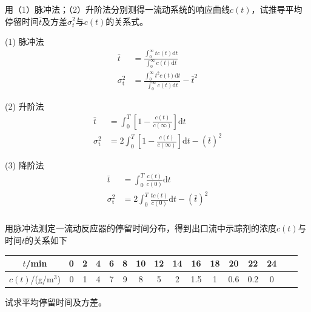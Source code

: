 \begin{frame}[t]
    \frametitle{}

    \begin{example}
        用（1）脉冲法；（2）升阶法分别测得一流动系统的响应曲线$c(t)$，试推导平均停留时间$\bar{t}$及方差$\sigma_{t}^{2}$与$c(t)$的关系式。
    \end{example}
    \pause
    \begin{minipage}{0.32\linewidth}
        (1) 脉冲法
        \[
            \begin{aligned}
                \bar{t}&=\frac{\int_{0}^{\infty} t c(t) \mathrm{d} t}{\int_{0}^{\infty} c(t) \mathrm{d} t} \\
                \sigma_{\mathrm{t}}^{2}&=\frac{\int_{0}^{\infty} t^2 c(t) \mathrm{d} t}{\int_{0}^{\infty} c(t) \mathrm{d} t}-\bar{t}^{2} 
            \end{aligned}
        \]
    \end{minipage}\hfill
    \begin{minipage}{0.32\linewidth}
        (2) 升阶法
        \[
            \begin{aligned}
                \bar{t}&=\int_{0}^{T} \left[1-\frac{c(t)}{c(\infty)}\right] \mathrm{d} t \\
                \sigma_{\mathrm{t}}^{2}&=2\int_{0}^{T} \left[1-\frac{c(t)}{c(\infty)}\right] \mathrm{d} t-(\bar{t})^{2} 
            \end{aligned}
        \]
    \end{minipage}\hfill
    \begin{minipage}{0.32\linewidth}
        (3) 降阶法
        \[
            \begin{aligned}
                \bar{t}&=\int_{0}^{T} \frac{c(t)}{c(0)} \mathrm{d} t \\
                \sigma_{\mathrm{t}}^{2}&=2\int_{0}^{T} \frac{tc(t)}{c(0)} \mathrm{d} t-(\bar{t})^{2} 
            \end{aligned}
        \]
    \end{minipage}
\end{frame}


\begin{frame}[t]
    \frametitle{}
    \begin{example}
        用脉冲法测定一流动反应器的停留时间分布，得到出口流中示踪剂的浓度$c(t)$与时间$t$的关系如下
        \begin{table}
            \centering
            \begin{tabular}{cccccccccccccccc}
                \bottomrule
                $t$/min & 0 & 2 & 4 & 6 & 8 & 10 & 12 & 14 & 16 & 18 & 20 & 22 & 24 \\ \hline
                $c(t)$/(g/m$^3$) & 0 & 1 & 4 & 7 & 9 & 8 & 5 & 2 & 1.5 & 1 & 0.6 & 0.2 & 0 \\ \toprule
            \end{tabular}
        \end{table}
        试求平均停留时间及方差。
    \end{example}
\end{frame}